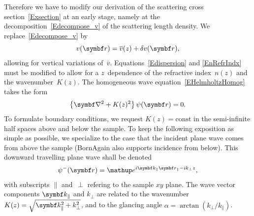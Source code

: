 Therefore we have to modify our derivation of
the scattering cross section~\cref{Exsection} at an early stage,
namely at the decomposition~\cref{Edecompose_v} of the scattering length density.
%
We replace~\cref{Edecompose_v} by
\begin{equation}\label{Edecompose_vz}
  v(\r) = \overline{v}(z) + \delta v(\r),
\end{equation}
allowing for vertical variations of~$\overline{v}$.
Equations~\cref{Edispersion} and \cref{EnRefrIndx} must be modified
to allow for a $z$~dependence of the refractive index~$n(z)$ and the wavenumber~$K(z)$.
The homogeneous wave equation~\cref{EHelmholtzHomog} takes the form
\begin{equation}\label{EWaveZ}
  \left\{\Nabla^2+K(z)^2\right\}\psi(\r) = 0.
\end{equation}
To formulate boundary conditions,
%
we request $K(z)=\text{const}$ in the semi-infinite half spaces above and below the sample.
To keep the following exposition as simple as possible,
we specialize to the case that the incident plane wave comes from above the sample
(BornAgain also supports incidence from below).
This downward travelling plane wave shall be denoted
%
%
\begin{equation}\label{Epsiminus}
  \psi^{-}(\r) = \e^{i\k_\parallel\r_\parallel-ik_{\perp}z},
\end{equation}
%
%
%
%
with subscripts $\parallel$ and~$\perp$ refering to the sample $xy$ plane.
The wave vector components $\k_\parallel$ and $k_{\perp}$ are related to
the wavenumber~$K(z)=\sqrt{\k_\parallel^2+k_{\perp}^2}$,
%
and to the glancing angle
%
$\alpha=\arctan(k_{\perp}/k_\parallel)$.

